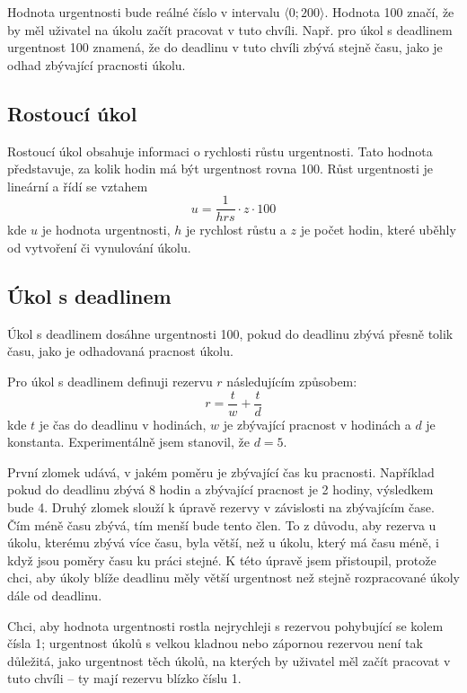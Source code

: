 \documentclass[thesis=B,czech]{FITthesis}[2012/06/26]
\begin{document}
		Hodnota urgentnosti bude reálné číslo v intervalu $\langle 0; 200 \rangle$. Hodnota 100 značí, že by měl uživatel na úkolu začít pracovat v tuto chvíli. Např. pro úkol s deadlinem urgentnost 100 znamená, že do deadlinu v tuto chvíli zbývá stejně času, jako je odhad zbývající pracnosti úkolu.
	
		\subsection{Rostoucí úkol}
			Rostoucí úkol obsahuje informaci o rychlosti růstu urgentnosti. Tato hodnota představuje, za kolik hodin má být urgentnost rovna 100. Růst urgentnosti je lineární a řídí se vztahem
			$$
				u = \frac{1}{hrs} \cdot z \cdot 100
			$$
			kde $u$ je hodnota urgentnosti, $h$ je rychlost růstu a $z$ je počet hodin, které uběhly od vytvoření či vynulování úkolu.
		
		
		\subsection{Úkol s deadlinem}
			Úkol s deadlinem dosáhne urgentnosti 100, pokud do deadlinu zbývá přesně tolik času, jako je odhadovaná pracnost úkolu.
		
			Pro úkol s deadlinem definuji rezervu $r$ následujícím způsobem:
			\begin{equation}
				r = \frac{t}{w} + \frac{t}{d}
			\end{equation}
			kde $t$ je čas do deadlinu v hodinách, $w$ je zbývající pracnost v hodinách a $d$ je konstanta. Experimentálně jsem stanovil, že $d=5$. 
			
			První zlomek udává, v jakém poměru je zbývající čas ku pracnosti. Například pokud do deadlinu zbývá 8 hodin a zbývající pracnost je 2 hodiny, výsledkem bude 4. Druhý zlomek slouží k úpravě rezervy v závislosti na zbývajícím čase. Čím méně času zbývá, tím menší bude tento člen. To z důvodu, aby rezerva u úkolu, kterému zbývá více času, byla větší, než u úkolu, který má času méně, i když jsou poměry času ku práci stejné. 
			K této úpravě jsem přistoupil, protože chci, aby úkoly blíže deadlinu měly větší urgentnost než stejně rozpracované úkoly dále od deadlinu.
			
			Chci, aby hodnota urgentnosti rostla nejrychleji s rezervou pohybující se kolem čísla 1; urgentnost úkolů s velkou kladnou nebo zápornou rezervou není tak důležitá, jako urgentnost těch úkolů, na kterých by uživatel měl začít pracovat v tuto chvíli -- ty mají rezervu blízko číslu 1. 
			
\end{document}
